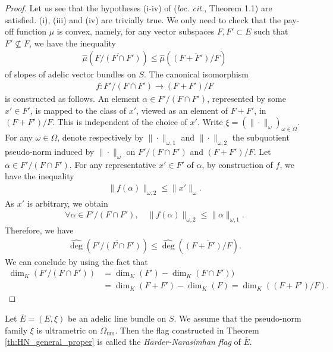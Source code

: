 \documentclass [11pt,reqno]{amsart}
\newcommand{\1}{\mathmybb{1}}
\def\um{\operatorname{um}}
\begin{document}
\begin{proof}
Let us see that the hypotheses (i-iv) of (\emph{loc. cit.}, Theorem 1.1) are satisfied. (i), (iii) and (iv) are trivially true. We only need to check that the pay-off function $\mu$ is convex, namely, for any vector subspaces $F,F'\subset E$ such that $F' \nsubseteq F$, we have the inequality
\begin{align*}
\widehat{\mu}(\overline{F/(F\cap F')}) \leq \widehat{\mu}(\overline{(F+F')/F})
\end{align*}
of slopes of adelic vector bundles on $S$. The canonical isomorphism 
\begin{align*}
f : F'/(F\cap F') \to (F+F')/F
\end{align*}
is constructed as follows. An element $\alpha \in F'/(F\cap F')$, represented by some $x'\in F'$, is mapped to the class of $x'$, viewed as an element of $F+F'$, in $(F+F')/F$. This is independent of the choice of $x'$. Write $\xi=(\|\cdot\|_{\omega})_{\omega\in\Omega}$. For any $\omega\in \Omega$, denote respectively by $\|\cdot\|_{\omega,1}$ and $\|\cdot\|_{\omega,2}$ the subquotient pseudo-norm induced by $\|\cdot\|_{\omega}$ on $F'/(F\cap F')$ and $(F+F')/F$. Let $\alpha \in F'/(F\cap F')$. For any representative $x'\in F'$ of $\alpha$, by construction of $f$, we have the inequality 
\begin{align*}
\|f(\alpha)\|_{\omega,2} \leq \|x'\|_{\omega}.
\end{align*}
As $x'$ is arbitrary, we obtain
\begin{align*}
\forall \alpha\in F'/(F\cap F'), \quad \|f(\alpha)\|_{\omega,2} \leq \|\alpha\|_{\omega,1}.
\end{align*} Therefore, we have
\begin{align*}
\widehat{\deg}(\overline{F'/(F\cap F')}) \leq \widehat{\deg}(\overline{(F+F')/F}).
\end{align*}
We can conclude by using the fact that 
\begin{align*}
\dim_{K}(F'/(F\cap F')) &= \dim_{K}(F') -\dim_{K}(F\cap F')) \\
&= \dim_{K}(F+F') - \dim_{K}(F) = \dim_{K}((F+F')/F).
\end{align*}
\end{proof}

\begin{definition}
\label{def:HN_flag_general_proper}
Let $\overline{E}=(E,\xi)$ be an adelic line bundle on $S$. We assume that the pseudo-norm family $\xi$ is ultrametric on $\Omega_{\um}$. Then the flag constructed in Theorem \ref{th:HN_general_proper} is called the \emph{Harder-Narasimhan flag} of $\overline{E}$. 
\end{definition}
\end{document}
